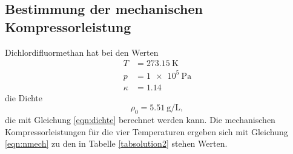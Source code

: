 \subsection{Bestimmung der mechanischen Kompressorleistung}
Dichlordifluormethan hat bei den Werten
\begin{align*}
    T &= \SI{273.15}{\kelvin} \\
    p &= \SI{1e5}{\pascal} \\
    \kappa &= \num{1.14}
\end{align*}
die Dichte 
\begin{equation*}
    \rho_0 = \SI{5.51}{\gram\per\liter},
\end{equation*}
die mit Gleichung \eqref{eqn:dichte} berechnet werden kann.
Die mechanischen Kompressorleistungen für die vier Temperaturen
ergeben sich mit Gleichung \eqref{eqn:nmech}
zu den in Tabelle \ref{tabsolution2} stehen Werten.
